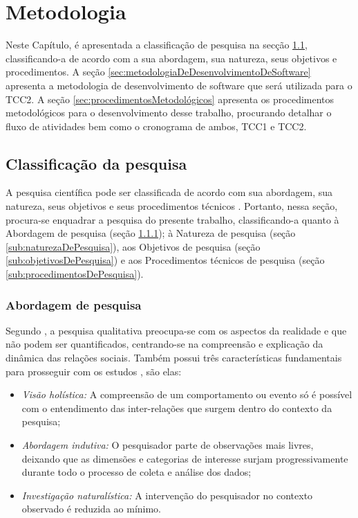 \chapter{Metodologia}
\label{chap:metodologia}

Neste Capítulo, é apresentada a classificação de pesquisa na secção \ref{sec:classificacaoDaPesquisa}, classificando-a de acordo com a sua abordagem, sua natureza, seus objetivos e procedimentos. A seção \ref{sec:metodologiaDeDesenvolvimentoDeSoftware} apresenta a metodologia de desenvolvimento de software que será utilizada para o TCC2. A seção \ref{sec:procedimentosMetodológicos} apresenta os procedimentos metodológicos para o desenvolvimento desse trabalho, procurando detalhar o fluxo de atividades bem como o cronograma de ambos, TCC1 e TCC2.  

\section{Classificação da pesquisa}
\label{sec:classificacaoDaPesquisa}

A pesquisa científica pode ser classificada de acordo com sua abordagem, sua natureza, seus objetivos e seus procedimentos técnicos \cite{gerhardt2009metodos}. Portanto, nessa seção, procura-se enquadrar a pesquisa do presente trabalho, classificando-a quanto à Abordagem de pesquisa (seção \ref{sub:abordagemDePesquisa}); à Natureza de pesquisa (seção \ref{sub:naturezaDePesquisa}), aos Objetivos de pesquisa (seção \ref{sub:objetivosDePesquisa}) e aos Procedimentos técnicos de pesquisa (seção \ref{sub:procedimentosDePesquisa}).

\subsection{Abordagem de pesquisa}
\label{sub:abordagemDePesquisa}

Segundo \cite{gerhardt2009metodos}, a pesquisa qualitativa preocupa-se com os aspectos da realidade e que não podem ser quantificados, centrando-se na compreensão e explicação da dinâmica das relações sociais. Também possui três características fundamentais para prosseguir com os estudos \cite{mazzotti1991planejamento}, são elas:

\begin{itemize}
	\item \textit{Visão holística:} A compreensão de um comportamento ou evento só é possível com o entendimento das inter-relações que surgem dentro do contexto da pesquisa;
	\item \textit{Abordagem indutiva:} O pesquisador parte de observações mais livres, deixando que as dimensões e categorias de interesse surjam progressivamente durante todo o processo de coleta e análise dos dados;
	\item \textit{Investigação naturalística:} A intervenção do pesquisador no contexto observado é reduzida ao mínimo.
\end{itemize}

